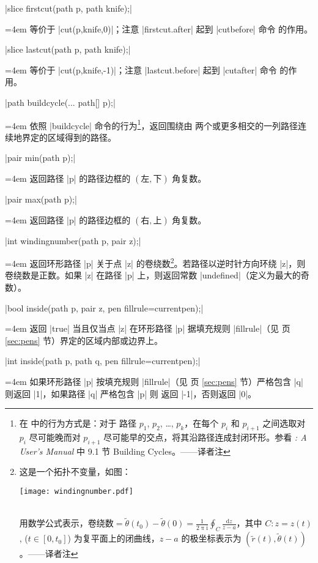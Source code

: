 \documentclass{ctexbook}
\makeatletter
\newcommand\dif{\mathrm{d}}
\newcommand\mi{\mathrm{i}}
\newenvironment{funclist}{\trivlist
  \parindent=0pt
\item[]
  \def\item{\medskip\par\leftskip=0pt}
  \def\go{\par\leftskip=4em}}
{\endtrivlist}
\newenvironment{typelist}{\itemize
  \let\old@item\@item
  \def\@item[##1]{\expandafter\old@item[\ttfamily\color{type!50!black}##1]}}
{\enditemize}
\newcommand\transnote[1]{\footnote{#1——译者注}}
\makeatother
\begin{document}
\begin{typelist}
\begin{funclist}
\item |slice firstcut(path p, path knife);| \go
  等价于 |cut(p,knife,0)|；注意 |firstcut.after| 起到 \MP{} |cutbefore| 命令
  的作用。

\item |slice lastcut(path p, path knife);| \go
  等价于 |cut(p,knife,-1)|；注意 |lastcut.before| 起到 \MP{} |cutafter| 命令
  的作用。

\item |path buildcycle(... path[] p);| \go
  依照 \MP{} |buildcycle| 命令的行为\transnote{在 \MP{} 中的行为方式是：对于
  路径 $p_1$, $p_2$, \ldots, $p_k$，在每个 $p_i$ 和 $p_{i+1}$ 之间选取对
  $p_i$ 尽可能晚而对 $p_{i+1}$ 尽可能早的交点，将其沿路径连成封闭环形。参看
  \textit{\MP{}: A User's Manual} 中 9.1 节 Building Cycles。}，返回围绕由
  两个或更多相交的一列路径连续地界定的区域得到的路径。

\item |pair min(path p);| \go
  返回路径 |p| 的路径边框的 $(\text{左}, \text{下})$ 角复数。

\item |pair max(path p);| \go
  返回路径 |p| 的路径边框的 $(\text{右}, \text{上})$ 角复数。

\item |int windingnumber(path p, pair z);| \go
  返回环形路径 |p| 关于点 |z| 的卷绕数\transnote{这是一个拓扑不变量，如图：
  \\\centerline{\texttt{[image: windingnumber.pdf]}}\\
  用数学公式表示，$\text{卷绕数} = \tilde\theta(t_0) - \tilde\theta(0) =
  \frac{1}{2\uppi\mi} \oint_{C} \frac{\dif z}{z-a}$，其中 $C\colon z = z(t)$,
  ($t\in[0,t_0]$) 为复平面上的闭曲线，$z-a$ 的极坐标表示为 $(\tilde{r}(t),
  \tilde\theta(t))$。}。若路径以逆时针方向环绕 |z|，则卷绕数是正数。如果 |z|
  在路径 |p| 上，则返回常数 |undefined|（定义为最大的奇数）。

\item |bool inside(path p, pair z, pen fillrule=currentpen);| \go
  返回 |true| 当且仅当点 |z| 在环形路径 |p| 据填充规则 |fillrule|（见
  \pageref{sec:pens} 页 \ref{sec:pens} 节）界定的区域内部或边界上。

\item |int inside(path p, path q, pen fillrule=currentpen);| \go
  如果环形路径 |p| 按填充规则 |fillrule|（见 \pageref{sec:pens} 页
  \ref{sec:pens} 节）严格包含 |q| 则返回 |1|，如果路径 |q| 严格包含 |p| 则
  返回 |-1|，否则返回 |0|。


\end{funclist}
\end{typelist}
\end{document}
